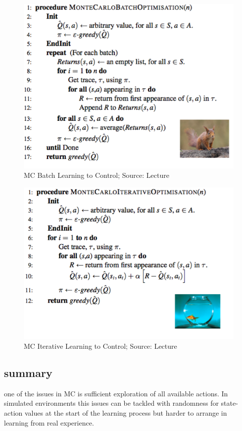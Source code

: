\begin{figure}[h!]
  \centering
  \includegraphics[scale=0.5]{figures/mc_batch_greedy.PNG}
  \caption{MC Batch Learning to Control; Source: Lecture}
  \label{fig:mc_batch_greedy}
\end{figure}
\begin{figure}[h!]
  \centering
  \includegraphics[scale=0.5]{figures/mc_iterative_greedy.PNG}
  \caption{MC Iterative Learning to Control; Source: Lecture}
  \label{fig:mc_iterative_greedy}
\end{figure}

\subsection{summary }
one of the issues in MC is sufficient exploration of all available actions. In simulated environments this issues can be tackled with randomness for state-action values at the start of  the learning process but harder to arrange in learning from real experience. \\

